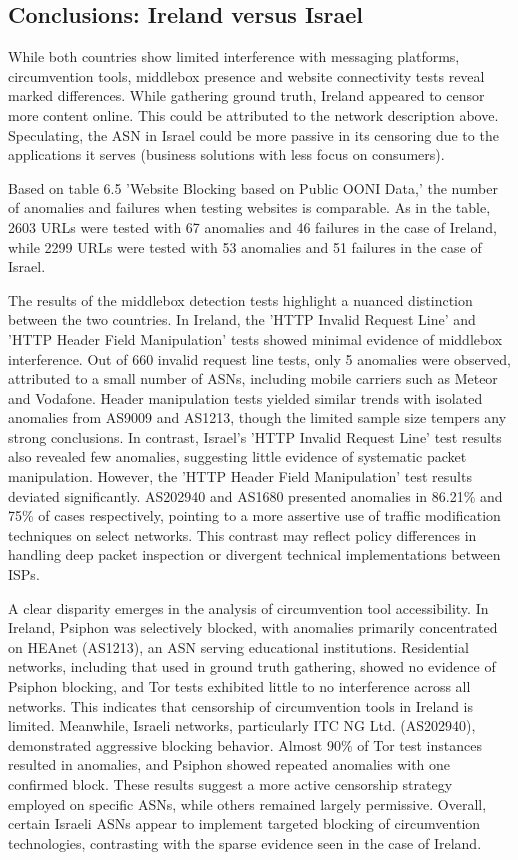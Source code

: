 \subsection{Conclusions: Ireland versus Israel}
While both countries show limited interference with messaging platforms, circumvention tools, middlebox presence and website connectivity tests reveal marked differences. While gathering ground truth, Ireland appeared to censor more content online. This could be attributed to the network description above. Speculating, the ASN in Israel could be more passive in its censoring due to the applications it serves (business solutions with less focus on consumers). 

Based on table 6.5 'Website Blocking based on Public OONI Data,' the number of anomalies and failures when testing websites is comparable. As in the table, 2603 URLs were tested with 67 anomalies and 46 failures in the case of Ireland, while 2299 URLs were tested with 53 anomalies and 51 failures in the case of Israel.

The results of the middlebox detection tests highlight a nuanced distinction between the two countries. In Ireland, the 'HTTP Invalid Request Line' and 'HTTP Header Field Manipulation' tests showed minimal evidence of middlebox interference. Out of 660 invalid request line tests, only 5 anomalies were observed, attributed to a small number of ASNs, including mobile carriers such as Meteor and Vodafone. Header manipulation tests yielded similar trends with isolated anomalies from AS9009 and AS1213, though the limited sample size tempers any strong conclusions. In contrast, Israel's 'HTTP Invalid Request Line' test results also revealed few anomalies, suggesting little evidence of systematic packet manipulation. However, the 'HTTP Header Field Manipulation' test results deviated significantly. AS202940 and AS1680 presented anomalies in 86.21\% and 75\% of cases respectively, pointing to a more assertive use of traffic modification techniques on select networks. This contrast may reflect policy differences in handling deep packet inspection or divergent technical implementations between ISPs.

A clear disparity emerges in the analysis of circumvention tool accessibility. In Ireland, Psiphon was selectively blocked, with anomalies primarily concentrated on HEAnet (AS1213), an ASN serving educational institutions. Residential networks, including that used in ground truth gathering, showed no evidence of Psiphon blocking, and Tor tests exhibited little to no interference across all networks. This indicates that censorship of circumvention tools in Ireland is limited. Meanwhile, Israeli networks, particularly ITC NG Ltd. (AS202940), demonstrated aggressive blocking behavior. Almost 90\% of Tor test instances resulted in anomalies, and Psiphon showed repeated anomalies with one confirmed block. These results suggest a more active censorship strategy employed on specific ASNs, while others remained largely permissive. Overall, certain Israeli ASNs appear to implement targeted blocking of circumvention technologies, contrasting with the sparse evidence seen in the case of Ireland.


